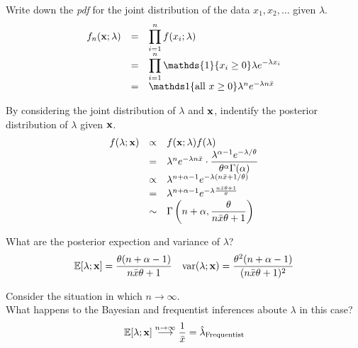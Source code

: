 \documentclass[11pt,a4paper]{article}
\begin{document}
\qpartnb Write down the \textit{pdf} for the joint distribution of the data $x_1,x_2,\dots$ given $\lambda$.\\

\apart
\[\begin{array}{rcl}
f_n(\x;\lambda)&=&\displaystyle\prod_{i=1}^nf(x_i;\lambda)\\
&=&\displaystyle\prod_{i=1}^n\mathds{1}\{x_i\geq0\}\lambda e^{-\lambda x_i}\\
&=&\mathds1\{\text{all }x\geq0\}\lambda^ne^{-\lambda n\bar{x}}
\end{array}\]

\qpartnb By considering the joint distribution of $\lambda$ and $\textbf{x}$, indentify the posterior distribution of $\lambda$ given $\textbf{x}$.\\

\apart
\[\begin{array}{rcl}
f(\lambda;\textbf{x})&\propto&f(\textbf{x};\lambda)f(\lambda)\\
&=&\lambda^ne^{-\lambda n\bar{x}}\cdot\dfrac{\lambda^{\alpha-1}e^{-\lambda/\theta}}{\theta^\alpha\Gamma(\alpha)}\\
&\propto&\lambda^{n+\alpha-1}e^{-\lambda(n\bar{x}+1/\theta)}\\
&=&\lambda^{n+\alpha-1}e^{-\lambda\frac{n\bar{x}\theta+1}\theta}\\
&\sim&\Gamma\left(n+\alpha,\dfrac{\theta}{n\bar{x}\theta+1}\right)
\end{array}\]

\qpartnb What are the posterior expection and variance of $\lambda$?\\

\apart
$$\mathbb{E}[\lambda;\textbf{x}]=\dfrac{\theta(n+\alpha-1)}{n\bar{x}\theta+1}\quad\mathrm{var}(\lambda;\textbf{x})=\dfrac{\theta^2(n+\alpha-1)}{(n\bar{x}\theta+1)^2}$$

\qpart
Consider the situation in which $n\to\infty$.\\
What happens to the Bayesian and frequentist inferences aboute $\lambda$ in this case?\\

\apart
$$\mathbb{E}[\lambda;\textbf{x}]\overset{n\to\infty}{\longrightarrow}\dfrac{1}{\bar{x}}=\hat\lambda_\text{Frequentist}$$
\end{document}
